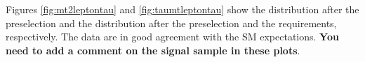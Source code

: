 


Figures \ref{fig:mt2leptontau} and \ref{fig:taumtleptontau} show the \mttwo distribution after the preselection and the \tauMT 
distribution after the preselection and the \mttwo requirements, respectively.
The data are in good agreement with the SM expectations.
{\bf You need to add a comment on the signal sample in these plots}.

